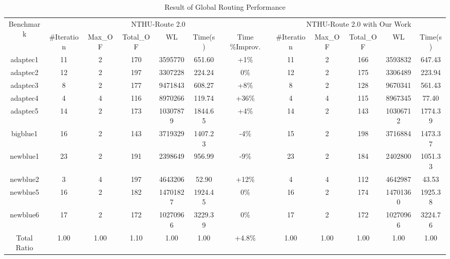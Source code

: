 \begin{table*}[htbp]
    \centering
    \caption{Result of Global Routing Performance}
    \label{tab:gr}
    \begin{tabular}{c|c|c|c|c|c|c|c|c|c|c|c}
        \toprule
        \multirow{2}{*}{Benchmark} & \multicolumn{6}{c|}{NTHU-Route 2.0}                                     & \multicolumn{5}{c}{NTHU-Route 2.0 with Our Work}      \\ \cline{2-12} 
                           & \#Iteration & Max\_OF & Total\_OF & WL       & Time(s) & Time \%Improv. & \#Iteration & Max\_OF & Total\_OF & WL       & Time(s) \\ \hline
        adaptec1                   & 11          & 2       & 170       & 3595770  & 651.60  & +1\%           & 11          & 2       & 166       & 3593832  & 647.43  \\ \hline
        adaptec2                   & 12          & 2       & 197       & 3307228  & 224.24  & 0\%            & 12          & 2       & 175       & 3306489  & 223.94  \\ \hline
        adaptec3                   & 8           & 2       & 177       & 9471843  & 608.27  & +8\%           & 8           & 2       & 128       & 9670341  & 561.43  \\ \hline
        adaptec4                   & 4           & 4       & 116       & 8970266  & 119.74  & +36\%          & 4           & 4       & 115       & 8967345  & 77.40   \\ \hline
        adaptec5                   & 14          & 2       & 173       & 10307879 & 1844.65 & +4\%           & 14          & 2       & 143       & 10306712 & 1774.39 \\ \hline
        bigblue1                   & 16          & 2       & 143       & 3719329  & 1407.23 & -4\%           & 15          & 2       & 198       & 3716884  & 1473.37 \\ \hline
        newblue1                   & 23          & 2       & 191       & 2398649  & 956.99  & -9\%           & 23          & 2       & 184       & 2402800  & 1051.33 \\ \hline
        newblue2                   & 3           & 4       & 197       & 4643206  & 52.90   & +12\%          & 4           & 4       & 112       & 4642987  & 43.53   \\ \hline
        newblue5                   & 16          & 2       & 182       & 14701827 & 1924.45 & 0\%            & 16          & 2       & 174       & 14701360 & 1925.38 \\ \hline
        newblue6                   & 17          & 2       & 172       & 10270966 & 3229.39 & 0\%            & 17          & 2       & 172       & 10270966 & 3224.76 \\ \hline
        Total Ratio                & 1.00        & 1.00    & 1.10      & 1.00     & 1.00    & +4.8\%         & 1.00        & 1.00    & 1.00      & 1.00     & 1.00    \\ \bottomrule
    \end{tabular}
\end{table*}


